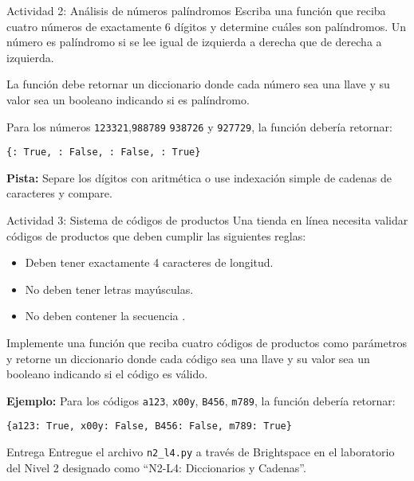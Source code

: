 \documentclass{ip-lab}
\begin{document}
\begin{sectionbox}{Actividad 2: Análisis de números palíndromos}
Escriba una función que reciba cuatro números de exactamente 6 dígitos y determine cuáles son palíndromos. Un número es palíndromo si se lee igual de izquierda a derecha que de derecha a izquierda.

La función debe retornar un diccionario donde cada número sea una llave y su valor sea un booleano indicando si es palíndromo.

Para los números \texttt{123321},\texttt{988789} \texttt{938726} y \texttt{927729}, la función debería retornar:

\texttt{\{\textquotedbl: True, \textquotedbl: False, \textquotedbl: False, \textquotedbl: True\}}

\textbf{Pista:} Separe los dígitos con aritmética o use indexación simple de cadenas de caracteres y compare.
\end{sectionbox}

\begin{sectionbox}{Actividad 3: Sistema de códigos de productos}
Una tienda en línea necesita validar códigos de productos que deben cumplir las siguientes reglas:
\begin{itemize}
  \item Deben tener exactamente 4 caracteres de longitud.
  \item No deben tener letras mayúsculas.
  \item No deben contener la secuencia \texttt{\textquotedbl}.
\end{itemize}

Implemente una función que reciba cuatro códigos de productos como parámetros y retorne un diccionario donde cada código sea una llave y su valor sea un booleano indicando si el código es válido.

\textbf{Ejemplo:} Para los códigos \texttt{\textquotedbl a123\textquotedbl}, \texttt{\textquotedbl x00y\textquotedbl}, \texttt{\textquotedbl B456\textquotedbl}, \texttt{\textquotedbl m789\textquotedbl}, la función debería retornar:

\texttt{\{\textquotedbl a123\textquotedbl: True, \textquotedbl x00y\textquotedbl: False, \textquotedbl B456\textquotedbl: False, \textquotedbl m789\textquotedbl: True\}}
\end{sectionbox}

\begin{sectionbox}{Entrega}
Entregue el archivo \texttt{n2\_l4.py} a través de Brightspace en el laboratorio del Nivel 2 designado como ``N2-L4: Diccionarios y Cadenas''.
\end{sectionbox}
\end{document}
